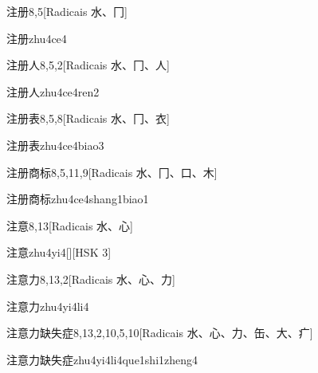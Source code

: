 \begin{entry}{注册}{8,5}[Radicais ⽔、⼌]
  \begin{phonetics}{注册}{zhu4ce4}
  \end{phonetics}
\end{entry}

\begin{entry}{注册人}{8,5,2}[Radicais ⽔、⼌、⼈]
  \begin{phonetics}{注册人}{zhu4ce4ren2}
  \end{phonetics}
\end{entry}

\begin{entry}{注册表}{8,5,8}[Radicais ⽔、⼌、⾐]
  \begin{phonetics}{注册表}{zhu4ce4biao3}
  \end{phonetics}
\end{entry}

\begin{entry}{注册商标}{8,5,11,9}[Radicais ⽔、⼌、⼝、⽊]
  \begin{phonetics}{注册商标}{zhu4ce4shang1biao1}
  \end{phonetics}
\end{entry}

\begin{entry}{注意}{8,13}[Radicais ⽔、⼼]
  \begin{phonetics}{注意}{zhu4yi4}[][HSK 3]
  \end{phonetics}
\end{entry}

\begin{entry}{注意力}{8,13,2}[Radicais ⽔、⼼、⼒]
  \begin{phonetics}{注意力}{zhu4yi4li4}
  \end{phonetics}
\end{entry}

\begin{entry}{注意力缺失症}{8,13,2,10,5,10}[Radicais ⽔、⼼、⼒、⽸、⼤、⽧]
  \begin{phonetics}{注意力缺失症}{zhu4yi4li4que1shi1zheng4}
  \end{phonetics}
\end{entry}

